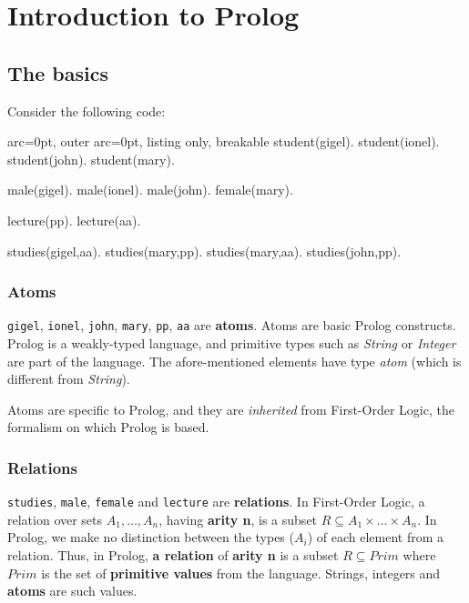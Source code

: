 \section*{ Introduction to Prolog }

\subsection*{ The basics }

Consider the following code:

\begin{tcblisting}{ arc=0pt, outer arc=0pt, listing only, breakable}
student(gigel).
student(ionel).
student(john).
student(mary).

male(gigel).
male(ionel).
male(john).
female(mary).

lecture(pp).
lecture(aa).

studies(gigel,aa).
studies(mary,pp).
studies(mary,aa).
studies(john,pp).

\end{tcblisting}


\subsubsection*{ Atoms }
\texttt{gigel}, \texttt{ionel}, \texttt{john}, \texttt{mary}, \texttt{pp}, \texttt{aa} are \textbf{atoms}. Atoms are basic Prolog constructs. Prolog is a weakly-typed language, and primitive types such as \textit{String} or \textit{Integer} are part of the language. The afore-mentioned elements have type \textit{atom} (which is different from \textit{String}).

Atoms are specific to Prolog, and they are \textit{inherited} from First-Order Logic, the formalism on which Prolog is based.

\subsubsection*{ Relations }

\texttt{studies}, \texttt{male}, \texttt{female} and \texttt{lecture} are \textbf{relations}. In First-Order Logic, a relation over sets $A_1, \ldots, A_n$, having \textbf{arity n}, is a subset $R\subseteq A_1 \times \ldots \times A_n$. In Prolog, we make no distinction between the types ($A_i$) of each element from a relation. Thus, in Prolog, \textbf{a relation} of \textbf{arity n} is a subset $R\subseteq Prim$ where $Prim$ is the set of \textbf{primitive values} from the language. Strings, integers and \textbf{atoms} are such values.

